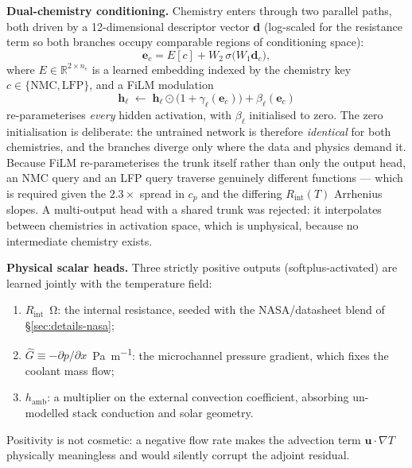 \documentclass[journal,10pt,compsoc,onecolumn]{IEEEtran}
\begin{document}
\noindent
\textbf{Dual-chemistry conditioning.} Chemistry enters through two parallel
paths, both driven by a \num{12}-dimensional descriptor vector $\mathbf{d}$
(log-scaled for the resistance term so both branches occupy comparable regions
of conditioning space):
\begin{equation}
 \mathbf{e}_c = E[c] + W_2\,\sigma\!\bigl(W_1\mathbf{d}_c\bigr),
\label{eq:embed}
\end{equation}
where $E\in\mathbb{R}^{2\times n_e}$ is a learned embedding indexed by the
chemistry key $c\in\{\mathrm{NMC},\mathrm{LFP}\}$, and a FiLM modulation
\begin{equation}
 \mathbf{h}_\ell \;\leftarrow\; \mathbf{h}_\ell\odot\bigl(1+\gamma_\ell(\mathbf{e}_c)\bigr)
                                   +\beta_\ell(\mathbf{e}_c)
\label{eq:film}
\end{equation}
re-parameterises \emph{every} hidden activation, with $\beta_\ell$ initialised to
zero. The zero initialisation is deliberate: the untrained network is therefore
\emph{identical} for both chemistries, and the branches diverge only where the
data and physics demand it. Because FiLM re-parameterises the trunk itself
rather than only the output head, an NMC query and an LFP query traverse
genuinely different functions --- which is required given the $2.3\times$ spread
in $c_p$ and the differing $R_{\mathrm{int}}(T)$ Arrhenius slopes. A
multi-output head with a shared trunk was rejected: it interpolates between
chemistries in activation space, which is unphysical, because no intermediate
chemistry exists.

\noindent
\textbf{Physical scalar heads.} Three strictly positive outputs
(softplus-activated) are learned jointly with the temperature field:
\begin{enumerate}[leftmargin=1.4em,itemsep=2pt,topsep=2pt]
\item $R_{\mathrm{int}}$~\si{\ohm}: the internal resistance, seeded with the
      NASA/datasheet blend of \S\ref{sec:details-nasa};
\item $\hat{G}\equiv-\partial p/\partial x$~\si{\pascal\per\metre}: the
      microchannel pressure gradient, which fixes the coolant mass flow;
\item $h_{\mathrm{amb}}$: a multiplier on the external convection
      coefficient, absorbing un-modelled stack conduction and solar geometry.
\end{enumerate}
Positivity is not cosmetic: a negative flow rate makes the advection term
$\mathbf{u}\cdot\nabla T$ physically meaningless and would silently corrupt the
adjoint residual.
\end{document}
